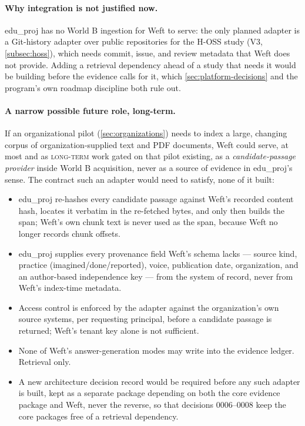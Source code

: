 \paragraph{Why integration is not justified now.}
edu\_proj has no World B ingestion for Weft to serve: the only planned adapter is a Git-history
adapter over public repositories for the H-OSS study (V3, \cref{subsec:hoss}), which needs commit,
issue, and review metadata that Weft does not provide. Adding a retrieval dependency ahead of a
study that needs it would be building before the evidence calls for it, which
\cref{sec:platform-decisions} and the program's own roadmap discipline both rule out.

\paragraph{A narrow possible future role, long-term.}
If an organizational pilot (\cref{sec:organizations}) needs to index a large, changing corpus of
organization-supplied text and PDF documents, Weft could serve, at most and as \textsc{long-term}
work gated on that pilot existing, as a \emph{candidate-passage provider} inside World B
acquisition, never as a source of evidence in edu\_proj's sense. The contract such an adapter would
need to satisfy, none of it built:
\begin{itemize}[noitemsep]
  \item edu\_proj re-hashes every candidate passage against Weft's recorded content hash, locates
    it verbatim in the re-fetched bytes, and only then builds the span; Weft's own chunk text is
    never used as the span, because Weft no longer records chunk offsets.
  \item edu\_proj supplies every provenance field Weft's schema lacks --- source kind, practice
    (imagined/done/reported), voice, publication date, organization, and an author-based
    independence key --- from the system of record, never from Weft's index-time metadata.
  \item Access control is enforced by the adapter against the organization's own source systems,
    per requesting principal, before a candidate passage is returned; Weft's tenant key alone is
    not sufficient.
  \item None of Weft's answer-generation modes may write into the evidence ledger. Retrieval only.
  \item A new architecture decision record would be required before any such adapter is built,
    kept as a separate package depending on both the core evidence package and Weft, never the
    reverse, so that decisions 0006--0008 keep the core packages free of a retrieval dependency.
\end{itemize}


